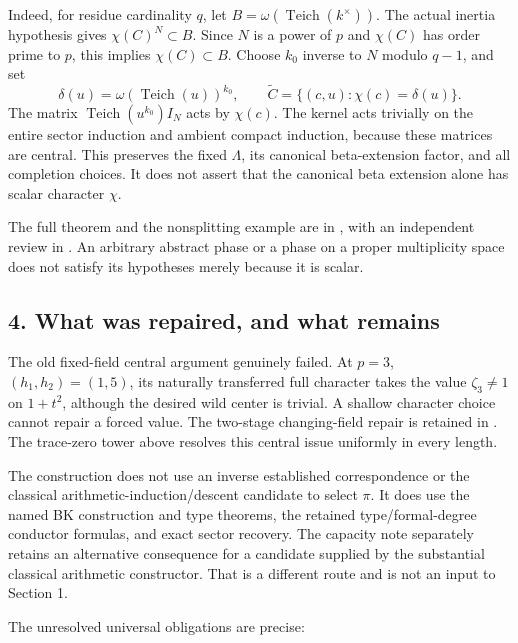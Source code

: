 Indeed, for residue cardinality \(q\), let
\(B=\omega(\operatorname{Teich}(k^\times))\). The actual inertia
hypothesis gives \(\chi(C)^N\subset B\). Since \(N\) is a power of \(p\)
and \(\chi(C)\) has order prime to \(p\), this implies
\(\chi(C)\subset B\). Choose \(k_0\) inverse to \(N\) modulo \(q-1\),
and set \[
\delta(u)=\omega(\operatorname{Teich}(u))^{k_0},\qquad
\widetilde C=\{(c,u):\chi(c)=\delta(u)\}.
\] The matrix \(\operatorname{Teich}(u^{k_0})I_N\) acts by \(\chi(c)\).
The kernel acts trivially on the entire sector induction and ambient
compact induction, because these matrices are central. This preserves
the fixed \(\Lambda\), its canonical beta-extension factor, and all
completion choices. It does not assert that the canonical beta extension
alone has scalar character \(\chi\).

The full theorem and the nonsplitting example are in
, with an
independent review in . An
arbitrary abstract phase or a phase on a proper multiplicity space does
not satisfy its hypotheses merely because it is scalar.

\hypertarget{odd_synthesis-what-was-repaired-and-what-remains}{%
\subsection{4. What was repaired, and what
remains}\label{odd_synthesis-what-was-repaired-and-what-remains}}

The old fixed-field central argument genuinely failed. At \(p=3\),
\((h_1,h_2)=(1,5)\), its naturally transferred full character takes the
value \(\zeta_3\ne1\) on \(1+t^2\), although the desired wild center is
trivial. A shallow character choice cannot repair a forced value. The
two-stage changing-field repair is retained in
. The trace-zero tower above
resolves this central issue uniformly in every length.

The construction does not use an inverse established correspondence or
the classical arithmetic-induction/descent candidate to select \(\pi\).
It does use the named BK construction and type theorems, the retained
type/formal-degree conductor formulas, and exact sector recovery. The
capacity note separately retains an alternative consequence for a
candidate supplied by the substantial classical arithmetic constructor. That is a different route and is not an input to Section 1.

The unresolved universal obligations are precise:

